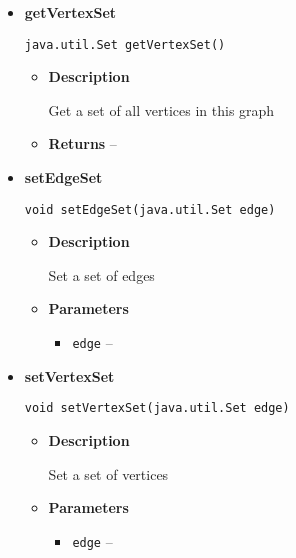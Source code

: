 {{{{{\begin{itemize}
{\begin{itemize}
{Get a set of all edges in this graph
}
\item{{\bf  Returns} -- 
 
}%
\end{itemize}
}%
\item{ 
{\bf  getVertexSet}\\
\begin{lstlisting}[frame=none]
java.util.Set getVertexSet()\end{lstlisting} %
\begin{itemize}
\item{
{\bf  Description}

Get a set of all vertices in this graph
}
\item{{\bf  Returns} -- 
 
}%
\end{itemize}
}%
\item{ 
{\bf  setEdgeSet}\\
\begin{lstlisting}[frame=none]
void setEdgeSet(java.util.Set edge)\end{lstlisting} %
\begin{itemize}
\item{
{\bf  Description}

Set a set of edges
}
\item{
{\bf  Parameters}
  \begin{itemize}
   \item{
\texttt{edge} -- }
  \end{itemize}
}%
\end{itemize}
}%
\item{ 
{\bf  setVertexSet}\\
\begin{lstlisting}[frame=none]
void setVertexSet(java.util.Set edge)\end{lstlisting} %
\begin{itemize}
\item{
{\bf  Description}

Set a set of vertices
}
\item{
{\bf  Parameters}
  \begin{itemize}
   \item{
\texttt{edge} -- }
  \end{itemize}
}%
\end{itemize}
}%
\end{itemize}
}
}
}}}
